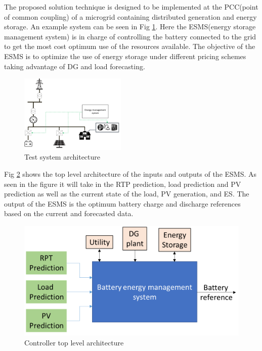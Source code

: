 The proposed solution technique is designed to be implemented at the PCC(point of common coupling) of a microgrid containing distributed generation and energy storage. An example system can be seen in Fig \ref{fig:system_arch}. Here the ESMS(energy storage management system) is in charge of controlling the battery connected to the grid to get the most cost optimum use of the resources available. The objective of the ESMS is to optimize the use of energy storage under different pricing schemes taking advantage of DG and load forecasting.
\begin{figure}[!htbp]
\centering
\includegraphics[width=0.45\textwidth]{figs/System_architecture.png}
\caption{Test system architecture}
\label{fig:system_arch}
\vspace{-3mm}
\end{figure}

 Fig \ref{fig:F1_CA} shows the top level architecture of the inputs and outputs of the ESMS. As seen in the figure it will take in the RTP prediction, load prediction and PV prediction as well as the current state of the load, PV generation, and ES. The output of the ESMS is the optimum battery charge and discharge references based on the current and forecasted data.

\begin{figure}[!ht]
    \centering
    \includegraphics[width = \linewidth]{figs/EMS_FIG.png}
    \caption{Controller top level architecture}
    \label{fig:F1_CA}
\end{figure}

